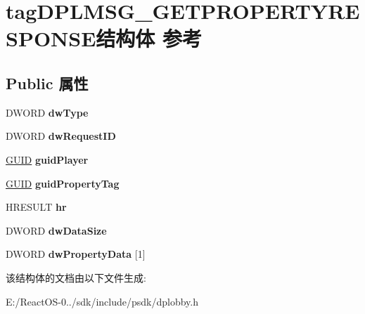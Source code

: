 \hypertarget{structtag_d_p_l_m_s_g___g_e_t_p_r_o_p_e_r_t_y_r_e_s_p_o_n_s_e}{}\section{tag\+D\+P\+L\+M\+S\+G\+\_\+\+G\+E\+T\+P\+R\+O\+P\+E\+R\+T\+Y\+R\+E\+S\+P\+O\+N\+S\+E结构体 参考}
\label{structtag_d_p_l_m_s_g___g_e_t_p_r_o_p_e_r_t_y_r_e_s_p_o_n_s_e}
\subsection*{Public 属性}
\begin{DoxyCompactItemize}
\item 
\mbox{\label{structtag_d_p_l_m_s_g___g_e_t_p_r_o_p_e_r_t_y_r_e_s_p_o_n_s_e_abc715a4ad8249cf1cc94f1d4c80bd1de}} 
D\+W\+O\+RD {\bfseries dw\+Type}
\item 
\mbox{\label{structtag_d_p_l_m_s_g___g_e_t_p_r_o_p_e_r_t_y_r_e_s_p_o_n_s_e_a45e86814d07bc1cb563a928ecdb3e82a}} 
D\+W\+O\+RD {\bfseries dw\+Request\+ID}
\item 
\mbox{\label{structtag_d_p_l_m_s_g___g_e_t_p_r_o_p_e_r_t_y_r_e_s_p_o_n_s_e_a2f9f3883a241d77c2580e98e359876cd}} 
\hyperlink{interface_g_u_i_d}{G\+U\+ID} {\bfseries guid\+Player}
\item 
\mbox{\label{structtag_d_p_l_m_s_g___g_e_t_p_r_o_p_e_r_t_y_r_e_s_p_o_n_s_e_a6245b2c29e32b08b1253595fbb474182}} 
\hyperlink{interface_g_u_i_d}{G\+U\+ID} {\bfseries guid\+Property\+Tag}
\item 
\mbox{\label{structtag_d_p_l_m_s_g___g_e_t_p_r_o_p_e_r_t_y_r_e_s_p_o_n_s_e_aa46ae91d12be68aea137ce042c44bd09}} 
H\+R\+E\+S\+U\+LT {\bfseries hr}
\item 
\mbox{\label{structtag_d_p_l_m_s_g___g_e_t_p_r_o_p_e_r_t_y_r_e_s_p_o_n_s_e_aa127efbfda298357684c41841ad7693f}} 
D\+W\+O\+RD {\bfseries dw\+Data\+Size}
\item 
\mbox{\label{structtag_d_p_l_m_s_g___g_e_t_p_r_o_p_e_r_t_y_r_e_s_p_o_n_s_e_a019e50c91d004e217cc77c18ba4152eb}} 
D\+W\+O\+RD {\bfseries dw\+Property\+Data} \mbox{[}1\mbox{]}
\end{DoxyCompactItemize}


该结构体的文档由以下文件生成\+:\begin{DoxyCompactItemize}
\item 
E\+:/\+React\+O\+S-\/0../sdk/include/psdk/dplobby.\+h\end{DoxyCompactItemize}
